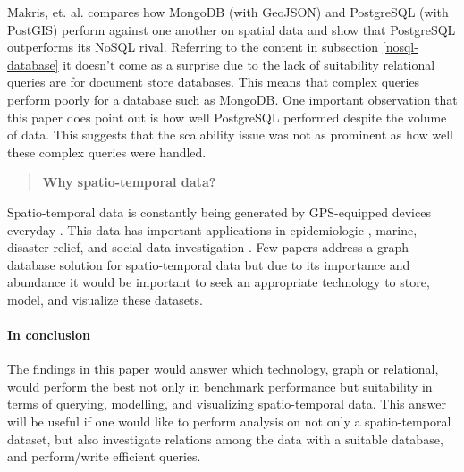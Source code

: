 Makris, et. al. \cite{mongovspostgres} compares how MongoDB (with GeoJSON) and PostgreSQL (with PostGIS) perform against one another on spatial data and show that PostgreSQL outperforms its NoSQL rival. Referring to the content in subsection \ref{nosql-database} it doesn't come as a surprise due to the lack of suitability relational queries are for document store databases. This means that complex queries perform poorly for a database such as MongoDB. One important observation that this paper does point out is how well PostgreSQL performed despite the volume of data. This suggests that the scalability issue was not as prominent as how well these complex queries were handled.

\begin{quote}
    \textbf{Why spatio-temporal data?}
\end{quote}

Spatio-temporal data is constantly being generated by GPS-equipped devices everyday \cite{twitterdata}\cite{clost}. This data has important applications in epidemiologic \cite{spatiotemporal-epidemiology}, marine, disaster relief, and social data investigation \cite{rao2012spatiotemporal}. Few papers address a graph database solution for spatio-temporal data but due to its importance and abundance it would be important to seek an appropriate technology to store, model, and visualize these datasets.

\paragraph{In conclusion} The findings in this paper would answer which technology, graph or relational, would perform the best not only in benchmark performance but suitability in terms of querying, modelling, and visualizing spatio-temporal data. This answer will be useful if one would like to perform analysis on not only a spatio-temporal dataset, but also investigate relations among the data with a suitable database, and perform/write efficient queries.